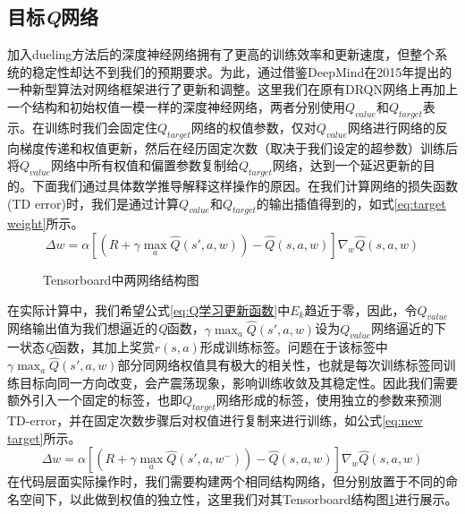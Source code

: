 \subsection{目标\textit{Q}网络}
加入dueling方法后的深度神经网络拥有了更高的训练效率和更新速度，但整个系统的稳定性却达不到我们的预期要求。为此，通过借鉴DeepMind在2015年提出的一种新型算法对网络框架进行了更新和调整。这里我们在原有DRQN网络上再加上一个结构和初始权值一模一样的深度神经网络，两者分别使用$Q_{value}$和$Q_{target}$表示。在训练时我们会固定住$Q_{target}$网络的权值参数，仅对$Q_{value}$网络进行网络的反向梯度传递和权值更新，然后在经历固定次数（取决于我们设定的超参数）训练后将$Q_{value}$网络中所有权值和偏置参数复制给$Q_{target}$网络，达到一个延迟更新的目的。下面我们通过具体数学推导解释这样操作的原因。在我们计算网络的损失函数(TD error)时，我们是通过计算$Q_{value}$和$Q_{target}$的输出插值得到的，如式\ref{eq:target weight}所示。
\begin{equation}\label{eq:target weight}
\Delta w=\alpha\left [ \left ( R+\gamma\max _{a} \hat{Q}\left ( {s}' ,a,w\right )\right )- \hat{Q}\left ( s ,a,w\right )\right ]\nabla_{w}\hat{Q}\left ( s,a,w \right )
\end{equation}
\begin{figure}[htbp]
	\begin{minipage}{\textwidth}
		\centering
		\subfigure{\label{fig:tensorboard_q_net}}\addtocounter{subfigure}{-2}
		\hspace{1em}
		\subfigure{\label{fig:tensorboard_q_target}}\addtocounter{subfigure}{-2}
		\hspace{1em}	
	\end{minipage}
	\vspace{0.2em}
	\caption{Tensorboard中两网络结构图}\label{fig:target网络}
\end{figure}
在实际计算中，我们希望公式\ref{eq:Q学习更新函数}中$E_{k}$趋近于零，因此，令$Q_{value}$网络输出值为我们想逼近的\textit{Q}函数，$\gamma\max _{a} \hat{Q}\left ( {s}' ,a,w\right )$设为$Q_{value}$网络逼近的下一状态\textit{Q}函数，其加上奖赏$r(s,a)$形成训练标签。问题在于该标签中$\gamma\max_{a}\hat{Q}\left ( {s}' ,a,w \right )$部分同网络权值具有极大的相关性，也就是每次训练标签同训练目标向同一方向改变，会产震荡现象，影响训练收敛及其稳定性。因此我们需要额外引入一个固定的标签，也即$Q_{target}$网络形成的标签，使用独立的参数来预测TD-error，并在固定次数步骤后对权值进行复制来进行训练，如公式\ref{eq:new target}所示。
\begin{equation}\label{eq:new target}
	\Delta w=\alpha\left [ \left ( R+\gamma\max _{a} \hat{Q}\left ( {s}' ,a,w^{-}\right )\right )- 	\hat{Q}\left ( s ,a,w\right )\right ]\nabla_{w}\hat{Q}\left ( s,a,w \right )
\end{equation}
在代码层面实际操作时，我们需要构建两个相同结构网络，但分别放置于不同的命名空间下，以此做到权值的独立性，这里我们对其Tensorboard结构图\ref{fig:target网络}进行展示。


